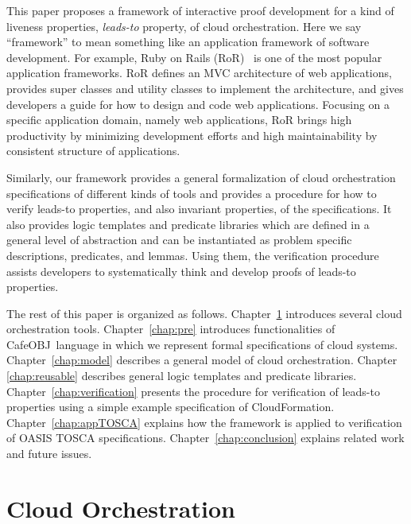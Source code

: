 \documentclass[12pt]{report}
\newcommand{\cafeobj}{{\sf CafeOBJ}~}
\begin{document}
This paper proposes a framework of interactive proof development for a
kind of liveness properties, {\it leads-to} property, of cloud
orchestration. Here we say ``framework'' to mean something like an
application framework of software development. For example, Ruby on
Rails (RoR)~\cite{RoR} is one of the most popular application
frameworks. RoR defines an MVC architecture of web applications,
provides super classes and utility classes to implement the
architecture, and gives developers a guide for how to design and code
web applications. Focusing on a specific application domain, namely web
applications, RoR brings high productivity by minimizing development
efforts and high maintainability by consistent structure of
applications.

Similarly, our framework provides a general formalization of cloud
orchestration specifications of different kinds of tools and provides
a procedure for how to verify leads-to properties, and also invariant
properties, of the specifications. It also provides logic templates
and predicate libraries which are defined in a general level of
abstraction and can be instantiated as problem specific descriptions,
predicates, and lemmas. Using them, the verification procedure assists
developers to systematically think and develop proofs of leads-to
properties.

The rest of this paper is organized as
follows. Chapter~\ref{chap:cloudorch} introduces several cloud
orchestration tools. Chapter~\ref{chap:pre} introduces functionalities
of \cafeobj language in which we represent formal specifications of
cloud systems. Chapter~\ref{chap:model} describes a general model of
cloud orchestration. Chapter \ref{chap:reusable} describes general
logic templates and predicate
libraries. Chapter~\ref{chap:verification} presents the procedure for
verification of leads-to properties using a simple example
specification of CloudFormation. Chapter~\ref{chap:appTOSCA} explains
how the framework is applied to verification of OASIS TOSCA
specifications.  Chapter~\ref{chap:conclusion} explains related work
and future issues.

\chapter{Cloud Orchestration}
\label{chap:cloudorch}

\end{document}
